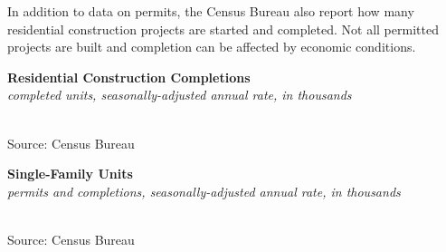 \documentclass{report}
\makeatletter
\newcommand{\tbllink}[1]{\href{https://raw.githubusercontent.com/bdecon/US-chartbook/master/chartbook/data/#1}{\faTable}}
\newcommand*\short[1]{\expandafter\@gobbletwo\number\numexpr#1\relax}
\newcommand{\dateaxisticks}{
		date coordinates in=x, axis line style={draw=none},
		xmax={2022-10-31},
		max space between ticks=40,	    
		xtick={{1990-01-01}, {1992-01-01}, {1994-01-01}, 
			{1996-01-01}, {1998-01-01}, {2000-01-01}, 
			{2002-01-01}, {2004-01-01}, {2006-01-01},
			{2008-01-01}, {2010-01-01}, {2012-01-01}, {2014-01-01},
		    {2016-01-01}, {2018-01-01}, {2020-01-01}, {2022-01-01}, 
		    {2024-01-01}, {2026-01-01}},
		minor xtick={{1989-01-01}, {1991-01-01}, {1993-01-01},
			{1995-01-01}, {1997-01-01}, {1999-01-01}, 
			{2001-01-01}, {2003-01-01}, {2005-01-01}, {2007-01-01},
		    {2009-01-01}, {2011-01-01}, {2013-01-01}, {2015-01-01},
		    {2017-01-01}, {2019-01-01}, {2021-01-01}, {2023-01-01}, 
		    {2025-01-01}, {2027-01-01}},
		enlarge y limits={0.06}, enlarge x limits={0.01},
		}
\newcommand{\bbar}[2]{extra #1 ticks = {{#2}}, extra #1 tick labels = ,
		extra #1 tick style = {grid=major, grid style={thick, black!25}},}
\newcommand{\stdline}[4]{\addplot[very thick, no markers, color=#1] 
		table [x=#2, y=#3, col sep=comma] {#4};	}
\newcommand{\thinline}[4]{\addplot[no markers, color=#1] 
		table [x=#2, y=#3, col sep=comma] {#4};	}
\newcommand{\rbars}{
		\fill[color=black!10] (axis cs:{1990-07-01},\pgfkeysvalueof{/pgfplots/ymin}) rectangle 
			(axis cs:{1991-03-01}, \pgfkeysvalueof{/pgfplots/ymax});
		\fill[color=black!10] (axis cs:{2007-12-01},\pgfkeysvalueof{/pgfplots/ymin}) rectangle 
			(axis cs:{2009-07-01}, \pgfkeysvalueof{/pgfplots/ymax});
		\fill[color=black!10] (axis cs:{2001-03-01},\pgfkeysvalueof{/pgfplots/ymin}) rectangle 
			(axis cs:{2001-11-01}, \pgfkeysvalueof{/pgfplots/ymax});
		\fill[color=black!10] (axis cs:{2020-02-01},\pgfkeysvalueof{/pgfplots/ymin}) rectangle 
			(axis cs:{2020-05-01}, \pgfkeysvalueof{/pgfplots/ymax});}
\makeatother
\begin{document}
{\begin{minipage}{0.76\textwidth}
\small In addition to data on permits, the Census Bureau also report how many residential construction projects are started and completed. Not all permitted projects are built and completion can be affected by economic conditions. 
\vspace{1mm}

\normalsize{\textbf{Residential Construction Completions}}\\
\footnotesize{\textit{completed units, seasonally-adjusted annual rate, in thousands}}\\
\hspace*{-2mm} \\
\footnotesize{Source: Census Bureau} \hfill \tbllink{permits_total.csv}
\vspace{2mm}

\small 
\vspace{1mm}

\normalsize \textbf{Single-Family Units}\\
\footnotesize{\textit{permits and completions, seasonally-adjusted annual rate, in thousands}}\\
\hspace*{-2mm} \\
\footnotesize{Source: Census Bureau} \hfill \tbllink{permits_single.csv}
\end{minipage}
\newpage
\begin{minipage}{0.76\textwidth}
\small 
\vspace{1mm}


\end{minipage}}
\end{document}
